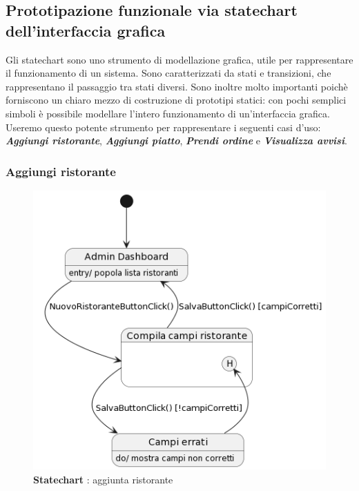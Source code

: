 \subsection{Prototipazione funzionale via statechart dell’interfaccia grafica}
    \begin{flushleft}
        Gli statechart sono uno strumento
        di modellazione grafica, utile per rappresentare il funzionamento di un
        sistema. Sono caratterizzati da stati e transizioni, che rappresentano il
        passaggio tra stati diversi. Sono inoltre molto importanti poichè forniscono
        un chiaro mezzo di costruzione di prototipi statici: con pochi semplici
        simboli è possibile modellare l'intero funzionamento di un'interfaccia grafica.
        Useremo questo potente strumento per rappresentare i seguenti casi d'uso:
        \emph{\textbf{Aggiungi ristorante}}, \emph{\textbf{Aggiungi piatto}}, 
        \emph{\textbf{Prendi ordine}} e \emph{\textbf{Visualizza avvisi}}. 
    \end{flushleft}

    \subsubsection{Aggiungi ristorante}
        \begin{figure}[H]
            \centering
            \includegraphics[scale=0.65]{assets/diagrammi/Statechart/aggiungiRistorante.png}
            \caption*{\textbf{Statechart} : aggiunta ristorante}\label{fig:Statechart_AddResturant}
        \end{figure}

